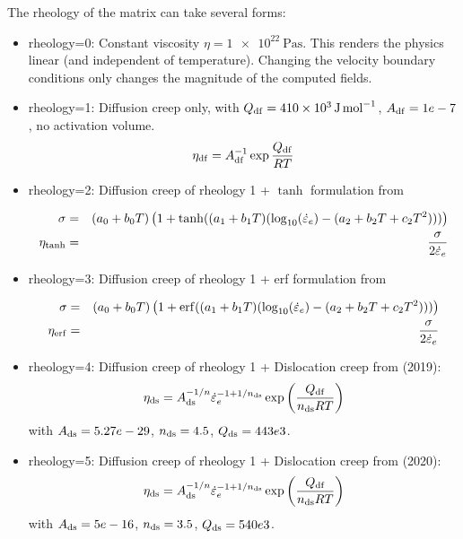 The rheology of the matrix can take several forms:
\begin{itemize}

\item {\python rheology=0}: Constant viscosity $\eta=\SI{1e22}{\pascal\second}$. This renders
the physics linear (and independent of temperature). Changing the velocity boundary conditions
only changes the magnitude of the computed fields.

\item {\python rheology=1}: Diffusion creep only, with $Q_{\rm df}=\SI{410e3}{\joule\per\mole}$, 
$A_{\rm df}=1e-7$, no activation volume.
\[
\eta_{\rm df}=A_{\rm df}^{-1}\exp \frac{Q_{\rm df}}{RT}
\]

\item {\python rheology=2}: Diffusion creep of rheology 1 + $\tanh$ formulation from \textcite{gatt20} 

\begin{eqnarray}
\sigma &=& (a_0+b_0T) \left( 1+ \tanh( (a_1+b_1T)(\log_{10}(\dot\varepsilon_e)-(a_2+b_2T+c_2T^2)) )\right)\nonumber\\
\eta_{\rm tanh}&=&\frac{\sigma}{2 \dot{\varepsilon}_e} \nonumber
\end{eqnarray}

\item {\python rheology=3}: Diffusion creep of rheology 1 + erf formulation from \textcite{gatt20} 


\begin{eqnarray}
\sigma &=&(a_0+b_0T) \left( 1+ {\rm erf}( (a_1+b_1T)(\log_{10}(\dot\varepsilon_e)- (a_2+b_2T+c_2T^2)) )  
\right) \nonumber\\
\eta_{\rm erf}&=&\frac{\sigma}{2 \dot{\varepsilon}_e} \nonumber
\end{eqnarray}


\item {\python rheology=4}: Diffusion creep of rheology 1 + Dislocation creep from \textcite{gocg19} (2019):
\[
\eta_{\rm ds} = A_{\rm ds}^{-1/n} \dot\varepsilon_e^{-1+1/n_{\rm ds}}
\exp\left( \frac{Q_{\rm df}}{n_{\rm ds}RT} \right)
\]
with $A_{\rm ds}=5.27e-29$, $n_{\rm ds}=4.5$, $Q_{\rm ds}=443e3$.

\item {\python rheology=5}: Diffusion creep of rheology 1 + Dislocation creep from \textcite{gatt20} (2020):
\[
\eta_{\rm ds} = A_{\rm ds}^{-1/n} \dot\varepsilon_e^{-1+1/n_{\rm ds}}
\exp\left( \frac{Q_{\rm df}}{n_{\rm ds}RT}\right)
\]
with $A_{\rm ds}=5e-16$, $n_{\rm ds}=3.5$, $Q_{\rm ds}=540e3$.


\end{itemize}



